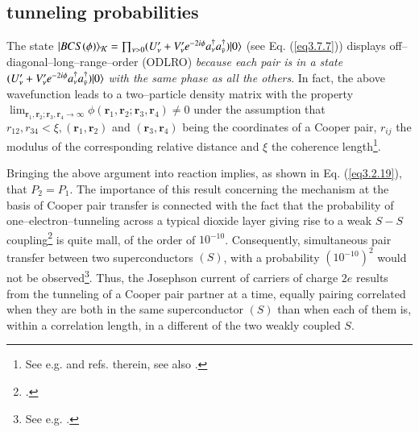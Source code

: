 \begin{subappendices}
 \subsection{tunneling probabilities}\label{App4.B.3}
 The state $ |{BCS(\phi)} \rangle_{\mathcal K}=\prod_{\nu>0}(U'_\nu+V'_\nu e^{-2i\phi} a_\nu^\dagger a_{\bar{\nu}}^\dagger)|{0} \rangle$ (see Eq. (\ref{eq3.7.7})) displays off--diagonal--long--range--order (ODLRO) \textit{because each pair is in a state $(U'_\nu+V'_\nu e^{-2i\phi} a_\nu^\dagger a_{\bar{\nu}}^\dagger)|{0} \rangle$ with the same phase as all the others}. In fact, the above wavefunction  leads to a two--particle density matrix with the property $\lim_{\mathbf r_1, \mathbf r_2;\mathbf r_3, \mathbf r_4\rightarrow\infty}\phi(\mathbf r_1, \mathbf r_2;\mathbf r_3, \mathbf r_4)\neq 0$ under the assumption that $r_{12}, r_{34}<\xi, (\mathbf r_1, \mathbf r_2)$ and $(\mathbf r_3, \mathbf r_4)$ being the coordinates of a Cooper pair, $r_{ij}$ the  modulus of the corresponding relative distance and $\xi$ the coherence length\footnote{See e.g. \cite{Ambegaokar:69} and refs. therein, see also \cite{Potel:17}.}.
 
 
Bringing the above argument into reaction implies, as shown in Eq. (\ref{eq3.2.19}), that $P_2=P_1$.
 The importance of this result  concerning the mechanism at the basis of Cooper pair transfer is connected with the fact that the probability of one--electron--tunneling across a typical dioxide layer giving rise to a weak $S-S$ coupling\footnote{\cite{Pippard:12}.} is quite mall, of the order of $10^{-10}$. Consequently, simultaneous pair transfer between two superconductors $(S)$, with a probability  $(10^{-10})^2$ would not be observed\footnote{See e.g. \cite{McDonald:01}.}. Thus, the Josephson current of carriers of charge $2e$ results from the tunneling of a Cooper pair partner at a time, equally pairing correlated when they are both in the same superconductor $(S)$ than when each of them is, within a correlation length,  in a different of the two weakly coupled $S$. 


\end{subappendices}
